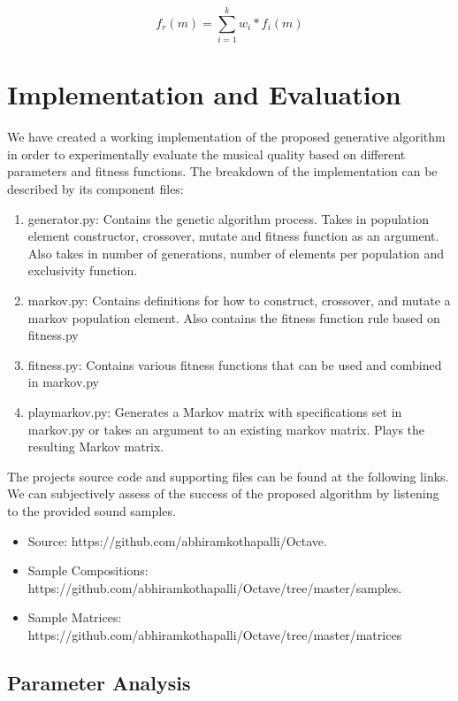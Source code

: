 \documentclass{article}
\begin{document}
\[
f_r(m) = \sum_{i = 1}^k{w_i * f_i (m)}
\]

\section{Implementation and Evaluation}

We have created a working implementation of the proposed generative algorithm in order to experimentally evaluate the musical quality based on different parameters and fitness functions. The breakdown of the implementation can be described by its component files:

\begin{enumerate}
\item generator.py: Contains the genetic algorithm process. Takes in population element constructor, crossover, mutate and fitness function as an argument. Also takes in number of generations, number of elements per population and exclusivity function.
\item markov.py: Contains definitions for how to construct, crossover, and mutate a markov population element. Also contains the fitness function rule based on fitness.py
\item fitness.py: Contains various fitness functions that can be used and combined in markov.py
\item playmarkov.py: Generates a Markov matrix with specifications set in markov.py or takes an argument to an existing markov matrix. Plays the resulting Markov matrix.
\end{enumerate}

The projects source code and supporting files can be found at the following links. We can subjectively assess of the success of the proposed algorithm by listening to the provided sound samples.


\begin{itemize}
\item Source: https://github.com/abhiramkothapalli/Octave.
\item Sample Compositions: https://github.com/abhiramkothapalli/Octave/tree/master/samples.
\item Sample Matrices: https://github.com/abhiramkothapalli/Octave/tree/master/matrices
\end{itemize}

\subsection{Parameter Analysis}
\end{document}
